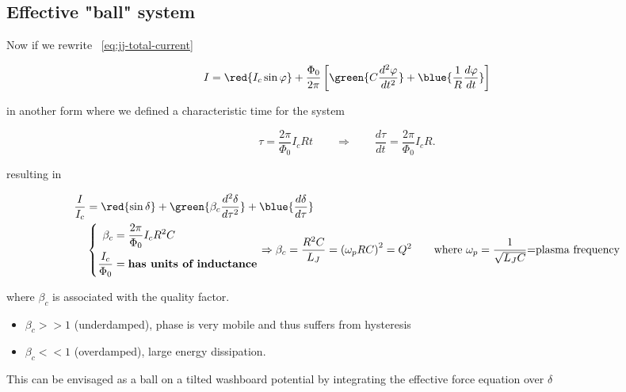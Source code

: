 \subsection{Effective "ball" system}
\label{sec:effect-ball-syst}

Now if we rewrite ~\autoref{eq:jj-total-current}

\begin{equation}\label{eq:jj-force-equation}
  I = \red{I_c\sin\varphi} + \frac{\Phi_0}{2\pi}\left[ \green{C
      \frac{d^2\varphi}{dt^{2}}}                                +
    \blue{\frac{1}{R}\frac{d\varphi}{dt}} \right]
\end{equation}

\noindent in another form where we defined a characteristic time for the
system

\begin{equation}
  \tau = \frac{2\pi}{\Phi_0}I_cR t  \qquad \Rightarrow \qquad \frac{d\tau}{dt} = \frac{2\pi}{\Phi_0}I_cR.
\end{equation}

\noindent resulting in

\begin{equation}
  \begin{aligned}
    \frac{I}{I_c} &= \red{\sin\delta} + \green{\beta_{c} \frac{d^2\delta}{d\tau^2}} + \blue{\frac{d\delta}{d\tau}} \\
    & \left\lbrace
      \begin{aligned}
        \beta_c & = \frac{2\pi}{\Phi_0}I_cR^2C\\
        \frac{I_c}{\Phi_0} & = \textbf{has units of inductance}
      \end{aligned}
    \right.  \Rightarrow \beta_c =  \frac{R^2C}{L_J} = \left( \omega_pRC
    \right)^2    =    Q^2    \qquad    \text{where    }    \omega_p    =
    \frac{1}{\sqrt{L_JC}} \text{=plasma frequency}
  \end{aligned}
\end{equation}

\noindent where $\beta_c$ is associated with the quality factor.
\begin{itemize}
\item $\beta_c>> 1$ (underdamped), phase is very mobile and thus suffers
  from hysteresis
\item $\beta_c << 1$ (overdamped), large energy dissipation.
\end{itemize}

This  can be  envisaged as  a ball  on a  tilted washboard  potential by
integrating the effective force equation over $\delta$

